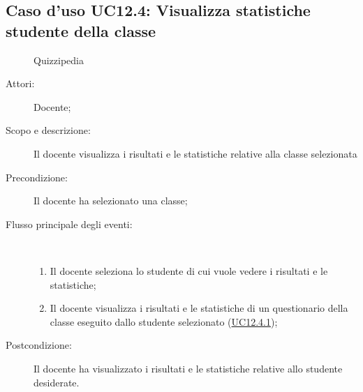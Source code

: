 \subsection{Caso d'uso UC12.4: Visualizza statistiche studente della classe}
	\begin{figure}[H]
		\centering
		\begin{resizedtikzpicture}{\textwidth}
		\begin{umlsystem}[x=0, fill=lightgray!20]{Quizzipedia}
		\end{umlsystem}
		\end{resizedtikzpicture}
		\caption{}
	\end{figure}
\begin{description}
\item[Attori:] Docente;
\item[Scopo e descrizione:] Il docente visualizza i risultati e le statistiche relative alla classe selezionata
      \item[Precondizione:] Il docente ha selezionato una classe;

        \item[Flusso principale degli eventi:] \ 
 \begin{enumerate}
          \item Il docente seleziona lo studente di cui vuole vedere i risultati e le statistiche;
          \item Il docente visualizza i risultati e le statistiche di un questionario della classe eseguito dallo studente selezionato (\hyperlink{UC12.4.1}{UC12.4.1});

      \end{enumerate}
    \item[Postcondizione:] Il docente ha visualizzato i risultati e le statistiche relative allo studente desiderate.
  \end{description}
\hypertarget{UC12.4.1}{}
